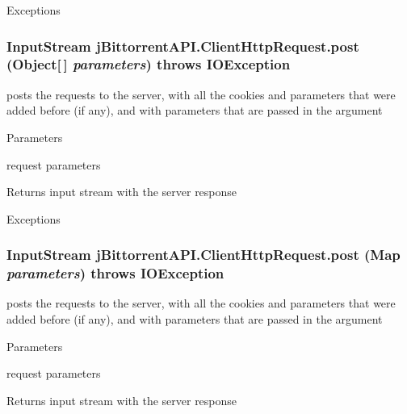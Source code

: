 \begin{DoxyExceptions}{Exceptions}
\item[{\em IOException}]\end{DoxyExceptions}
\hypertarget{classj_bittorrent_a_p_i_1_1_client_http_request_ad402ced5c00cd025ab544f95121fbf7e}{
\subsubsection[{post}]{\setlength{\rightskip}{0pt plus 5cm}InputStream jBittorrentAPI.ClientHttpRequest.post (Object\mbox{[}$\,$\mbox{]} {\em parameters})  throws IOException }}
\label{classj_bittorrent_a_p_i_1_1_client_http_request_ad402ced5c00cd025ab544f95121fbf7e}
posts the requests to the server, with all the cookies and parameters that were added before (if any), and with parameters that are passed in the argument 
\begin{DoxyParams}{Parameters}
\item[{\em parameters}]request parameters \end{DoxyParams}
\begin{DoxyReturn}{Returns}
input stream with the server response 
\end{DoxyReturn}

\begin{DoxyExceptions}{Exceptions}
\item[{\em IOException}]\end{DoxyExceptions}
\hypertarget{classj_bittorrent_a_p_i_1_1_client_http_request_a6bfab5893e7b93ee7b05aabe2a4b81ac}{
\subsubsection[{post}]{\setlength{\rightskip}{0pt plus 5cm}InputStream jBittorrentAPI.ClientHttpRequest.post (Map {\em parameters})  throws IOException }}
\label{classj_bittorrent_a_p_i_1_1_client_http_request_a6bfab5893e7b93ee7b05aabe2a4b81ac}
posts the requests to the server, with all the cookies and parameters that were added before (if any), and with parameters that are passed in the argument 
\begin{DoxyParams}{Parameters}
\item[{\em parameters}]request parameters \end{DoxyParams}
\begin{DoxyReturn}{Returns}
input stream with the server response 
\end{DoxyReturn}

